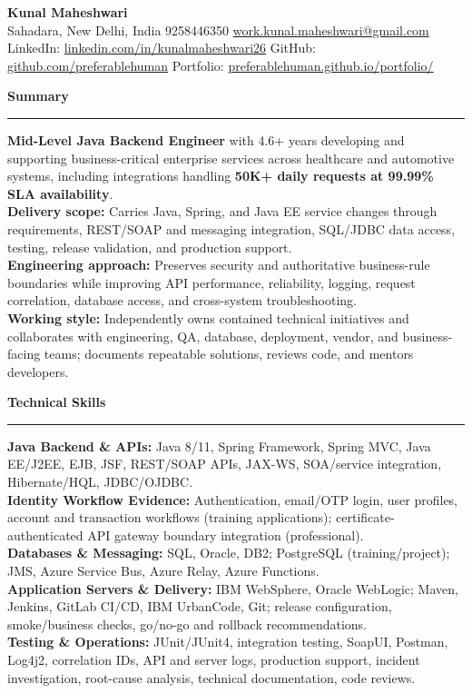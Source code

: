 \documentclass[11pt,letterpaper]{article}
\newcommand{\ressection}[1]{\Needspace{6\baselineskip}\vspace{8pt}\par\textbf{#1}\par\vspace{2pt}\hrule\vspace{5pt}}
\begin{document}
\pagestyle{empty}\raggedright\fontsize{11}{12.5}\selectfont

{\Large \textbf{Kunal Maheshwari}}\\
Sahadara, New Delhi, India \textbar{} 9258446350 \textbar{} \href{mailto:work.kunal.maheshwari@gmail.com}{work.kunal.maheshwari@gmail.com}\\
LinkedIn: \href{https://www.linkedin.com/in/kunalmaheshwari26}{linkedin.com/in/kunalmaheshwari26} \textbar{} GitHub: \href{https://github.com/preferablehuman}{github.com/preferablehuman} \textbar{} Portfolio: \href{https://preferablehuman.github.io/portfolio/}{preferablehuman.github.io/portfolio/}

\ressection{Summary}
\textbf{Mid-Level Java Backend Engineer} with 4.6+ years developing and supporting business-critical enterprise services across healthcare and automotive systems, including integrations handling \textbf{50K+ daily requests at 99.99\% SLA availability}.\\[2pt]
\textbf{Delivery scope:} Carries Java, Spring, and Java EE service changes through requirements, REST/SOAP and messaging integration, SQL/JDBC data access, testing, release validation, and production support.\\[2pt]
\textbf{Engineering approach:} Preserves security and authoritative business-rule boundaries while improving API performance, reliability, logging, request correlation, database access, and cross-system troubleshooting.\\[2pt]
\textbf{Working style:} Independently owns contained technical initiatives and collaborates with engineering, QA, database, deployment, vendor, and business-facing teams; documents repeatable solutions, reviews code, and mentors developers.

\ressection{Technical Skills}
\textbf{Java Backend \& APIs:} Java 8/11, Spring Framework, Spring MVC, Java EE/J2EE, EJB, JSF, REST/SOAP APIs, JAX-WS, SOA/service integration, Hibernate/HQL, JDBC/OJDBC.\\
\textbf{Identity Workflow Evidence:} Authentication, email/OTP login, user profiles, account and transaction workflows (training applications); certificate-authenticated API gateway boundary integration (professional).\\
\textbf{Databases \& Messaging:} SQL, Oracle, DB2; PostgreSQL (training/project); JMS, Azure Service Bus, Azure Relay, Azure Functions.\\
\textbf{Application Servers \& Delivery:} IBM WebSphere, Oracle WebLogic; Maven, Jenkins, GitLab CI/CD, IBM UrbanCode, Git; release configuration, smoke/business checks, go/no-go and rollback recommendations.\\
\textbf{Testing \& Operations:} JUnit/JUnit4, integration testing, SoapUI, Postman, Log4j2, correlation IDs, API and server logs, production support, incident investigation, root-cause analysis, technical documentation, code reviews.
\end{document}

